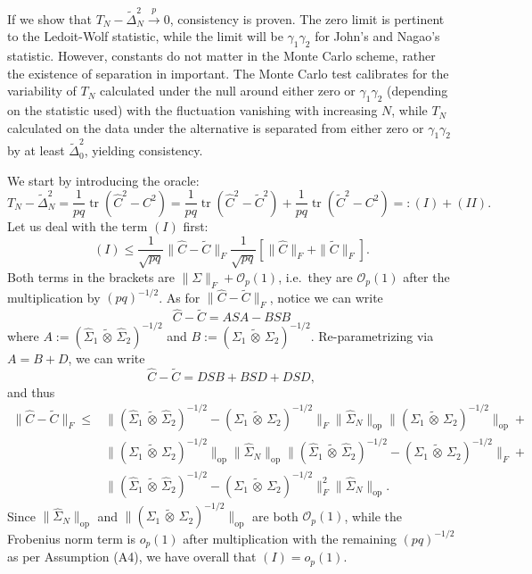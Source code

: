 \documentclass[12pt]{article}
\newcommand{\tr}{\operatorname{tr}}
\newcommand{\ot}{\,\tilde\otimes\,}
\newcommand{\pto}{\stackrel{p}{\to}}
\begin{document}
If we show that $T_N - \widetilde{\Delta}_N^2 \pto0$, consistency is proven. The zero limit is pertinent to the Ledoit-Wolf statistic, while the limit will be $\gamma_1\gamma_2$ for John's and Nagao's statistic. However, constants do not matter in the Monte Carlo scheme, rather the existence of separation in important. The Monte Carlo test calibrates for the variability of $T_N$ calculated under the null around either zero or $\gamma_1\gamma_2$ (depending on the statistic used) with the fluctuation vanishing with increasing $N$, while $T_N$ calculated on the data under the alternative is separated from either zero or $\gamma_1\gamma_2$ by at least $\widetilde{\Delta}_0^2$, yielding consistency.

We start by introducing the oracle:
\[
T_N - \widetilde{\Delta}_N^2 = \frac{1}{pq} \tr(\widehat{C}^2-C^2)  = \frac{1}{pq}\tr(\widehat{C}^2-\widetilde{C}^2) + \frac{1}{pq}\tr(\widetilde{C}^2-C^2) =: (I) + (II).
\]
Let us deal with the term $(I)$ first:
\[
(I) \leq \frac{1}{\sqrt{pq}}\|\widehat{C} - \widetilde{C}\|_F \frac{1}{\sqrt{pq}}\left[ \| \widehat{C}\|_F + \|\widetilde{C}\|_F \right].
\]
Both terms in the brackets are $\| \Sigma \|_F+\mathcal{O}_p(1)$, i.e.~they are $\mathcal{O}_p(1)$ after the multiplication by $(pq)^{-1/2}$. As for $\|\widehat{C} - \widetilde{C}\|_F$, notice we can write
\[
\widehat{C} - \widetilde{C} = A S A - BSB
\]
where $A:=(\widehat\Sigma_1 \ot \widehat\Sigma_2)^{-1/2}$ and $B := (\Sigma_1 \ot \Sigma_2)^{-1/2}$. Re-parametrizing via $A=B+D$, we can write
\[
\widehat{C} - \widetilde{C} = DSB+BSD+DSD,
\]
and thus
\[
\begin{split}
    \|\widehat{C} - \widetilde{C}\|_F \leq &\| (\widehat\Sigma_1 \ot \widehat\Sigma_2)^{-1/2} - (\Sigma_1 \ot \Sigma_2)^{-1/2} \|_F \| \widehat{\Sigma}_N \|_{\text{op}} \| (\Sigma_1 \ot \Sigma_2)^{-1/2} \|_{\text{op}} +\\
    &\| (\Sigma_1 \ot \Sigma_2)^{-1/2} \|_{\text{op}} \| \widehat{\Sigma}_N \|_{\text{op}} \| (\widehat\Sigma_1 \ot \widehat\Sigma_2)^{-1/2} - (\Sigma_1 \ot \Sigma_2)^{-1/2} \|_F +  \\
    &\| (\widehat\Sigma_1 \ot \widehat\Sigma_2)^{-1/2} - (\Sigma_1 \ot \Sigma_2)^{-1/2} \|_F^2 \| \widehat{\Sigma}_N \|_{\text{op}}.
\end{split}
\]
Since $\| \widehat{\Sigma}_N \|_{\text{op}}$ and $\| (\Sigma_1 \ot \Sigma_2)^{-1/2} \|_{\text{op}}$ are both $\mathcal{O}_p(1)$, while the Frobenius norm term is $o_p(1)$ after multiplication with the remaining $(pq)^{-1/2}$ as per Assumption (A4), we have overall that $(I) = o_p(1)$.
\end{document}
